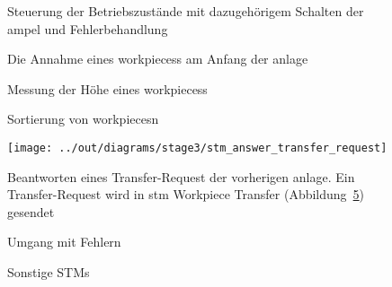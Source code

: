 \begin{figure}
    \caption{Steuerung der Betriebszustände mit dazugehörigem Schalten der \gls{ampel} und Fehlerbehandlung}
    \label{fig:stm_operation_manager}
\end{figure}

\begin{figure}
    \caption{Die Annahme eines \glspl{workpiece}s am Anfang der \gls{anlage}}
    \label{fig:stm_recieve_workpiece}
\end{figure}

\begin{figure}
    \caption{Messung der Höhe eines \glspl{workpiece}s}
    \label{fig:stm_hoehe_messen}
\end{figure}

\begin{figure}
    \caption{Sortierung von \glspl{workpiece}n}
    \label{fig:stm_sort_workpiece}
\end{figure}

\begin{figure}
    \centering
    \texttt{[image: ../out/diagrams/stage3/stm\_answer\_transfer\_request]}
    \caption{Beantworten eines Transfer-Request der vorherigen \gls{anlage}.
    Ein Transfer-Request wird in stm Workpiece Transfer (Abbildung~\ref{fig:stm_workpiece_transfer_request}) gesendet}
    \label{fig:stm_workpiece_transfer_request}
\end{figure}

\begin{figure}
    \caption{Umgang mit Fehlern}
    \label{fig:stm_error_listener}
\end{figure}

\begin{figure}
    \caption{Sonstige STMs}
    \label{fig:stm_small_stms}
\end{figure}


